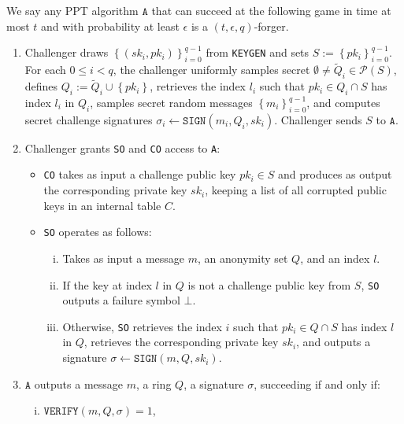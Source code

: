 \documentclass{llncs}
\newcommand{\A}{\texttt{A}}
\begin{document}
\begin{definition}\label{def:ex-unf}
We say any PPT algorithm $\A$ that can succeed at the following game in time at most $t$ and with probability at least $\epsilon$ is a $(t, \epsilon, q)$-forger.
\begin{enumerate}

\item Challenger draws $\left\{(sk_i, pk_i)\right\}_{i=0}^{q-1}$ from \texttt{KEYGEN} and sets $S := \left\{pk_i\right\}_{i=0}^{q-1}$. For each $0 \leq i < q$, the challenger uniformly samples secret $\emptyset \neq \widetilde{Q}_i \in \mathcal{P}\left(S\right)$, defines $Q_i := \widetilde{Q}_i \cup \left\{pk_i\right\}$, retrieves the index $l_i$ such that $pk_{i} \in Q_i \cap S$ has index $l_i$ in $Q_i$, samples secret random messages $\left\{m_i\right\}_{i=0}^{q-1}$, and computes secret challenge signatures $\sigma_i \leftarrow \texttt{SIGN}(m_i, Q_i, sk_i)$.  Challenger sends $S$ to $\A$.
\item Challenger grants \texttt{SO} and \texttt{CO} access to \A:
    \begin{itemize}
    \item \texttt{CO} takes as input a challenge public key $pk_i \in S$ and produces as output the corresponding private key $sk_i$, keeping a list of all corrupted public keys in an internal table $C$.

    \item \texttt{SO} operates as follows:
        \begin{enumerate}[(i)]
        \item Takes as input a message $m$, an anonymity set $Q$, and an index $l$.

        \item If the key at index $l$ in $Q$ is not a challenge public key from $S$, \texttt{SO} outputs a failure symbol $\bot$.

        \item Otherwise, \texttt{SO} retrieves the index $i$ such that $pk_{i} \in Q \cap S$ has index $l$ in $Q$, retrieves the corresponding private key $sk_{i}$, and outputs a signature $\sigma \leftarrow \texttt{SIGN}(m, Q, sk_{i})$.
        \end{enumerate}
    \end{itemize}

\item $\A$ outputs a message $m$, a ring $Q$, a signature $\sigma$, succeeding if and only if:
    \begin{enumerate}[(i)]
    \item $\texttt{VERIFY}(m, Q, \sigma) = 1$,


\end{enumerate}
\end{enumerate}
\end{definition}
\end{document}
